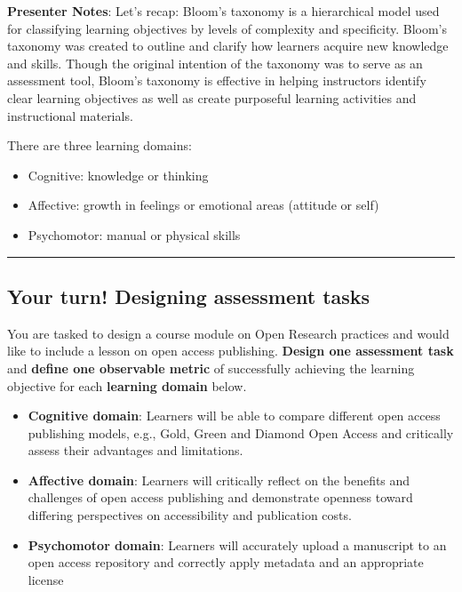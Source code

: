 \documentclass[
  letterpaper,
  DIV=11,
  numbers=noendperiod]{scrartcl}
\begin{document}
\textbf{Presenter Notes}: Let's recap: Bloom's taxonomy is a
hierarchical model used for classifying learning objectives by levels of
complexity and specificity. Bloom's taxonomy was created to outline and
clarify how learners acquire new knowledge and skills. Though the
original intention of the taxonomy was to serve as an assessment tool,
Bloom's taxonomy is effective in helping instructors identify clear
learning objectives as well as create purposeful learning activities and
instructional materials.

There are three learning domains:

\begin{itemize}
\item
  Cognitive: knowledge or thinking
\item
  Affective: growth in feelings or emotional areas (attitude or self)
\item
  Psychomotor: manual or physical skills
\end{itemize}

\begin{center}\rule{0.5\linewidth}{0.5pt}\end{center}

\subsection{Your turn! Designing assessment
tasks}\label{your-turn-designing-assessment-tasks}

You are tasked to design a course module on Open Research practices and
would like to include a lesson on open access publishing. \textbf{Design
one assessment task} and \textbf{define one observable metric} of
successfully achieving the learning objective for each \textbf{learning
domain} below.

\begin{itemize}
\item
  \textbf{Cognitive domain}: Learners will be able to compare different
  open access publishing models, e.g., Gold, Green and Diamond Open
  Access and critically assess their advantages and limitations.
\item
  \textbf{Affective domain}: Learners will critically reflect on the
  benefits and challenges of open access publishing and demonstrate
  openness toward differing perspectives on accessibility and
  publication costs.
\item
  \textbf{Psychomotor domain}: Learners will accurately upload a
  manuscript to an open access repository and correctly apply metadata
  and an appropriate license
\end{itemize}
\end{document}
